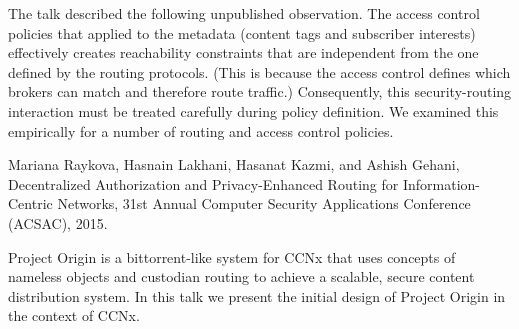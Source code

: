 \documentclass[a4paper,UKenglish]{dagrep}
\begin{document}
The talk described the following unpublished observation. The access control policies that applied to the metadata (content tags and subscriber interests) effectively creates reachability constraints that are independent from the one defined by the routing protocols. (This is because the access control defines which brokers can match and therefore route traffic.) Consequently, this security-routing interaction must be treated carefully during policy definition. We examined this empirically for a number of routing and access control policies.

\begin{thebibliography}{0}
 Mariana Raykova, Hasnain Lakhani, Hasanat Kazmi, and Ashish Gehani, Decentralized Authorization and Privacy-Enhanced Routing for Information-Centric Networks, 31st Annual Computer Security Applications Conference (ACSAC), 2015.
\end{thebibliography}

\license

Project Origin is a bittorrent-like system for CCNx that uses concepts of nameless objects and custodian routing to achieve a scalable, secure content distribution system. In this talk we present the initial design of Project Origin in the context of CCNx.

\license
\end{document}
